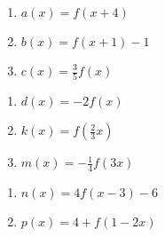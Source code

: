 \begin{multicols}{3}
\begin{enumerate}
\setcounter{enumi}{\value{HW}}

\item $a(x) = f(x + 4)$
\item $b(x) = f(x + 1) - 1$ 
\item $c(x) = \frac{3}{5}f(x)$


\setcounter{HW}{\value{enumi}}
\end{enumerate}
\end{multicols}

\begin{multicols}{3}
\begin{enumerate}
\setcounter{enumi}{\value{HW}}


\item $d(x) = -2f(x)$
\item $k(x) = f\left(\frac{2}{3}x\right)$
\item $m(x) = -\frac{1}{4}f(3x)$

\setcounter{HW}{\value{enumi}}
\end{enumerate}
\end{multicols}

\begin{multicols}{2}
\begin{enumerate}
\setcounter{enumi}{\value{HW}}

\item $n(x) = 4f(x - 3) - 6$
\item $p(x) = 4 + f(1 - 2x)$ \label{transthirdgraphlast}

\setcounter{HW}{\value{enumi}}
\end{enumerate}
\end{multicols}


